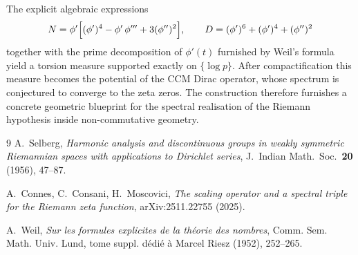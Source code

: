 \documentclass[11pt,a4paper]{article}
\begin{document}
The explicit algebraic expressions
\[
N=\phi'\Bigl[(\phi')^4-\phi'\,\phi'''+3(\phi'')^2\Bigr],\qquad
D=(\phi')^6+(\phi')^4+(\phi'')^2
\]
together with the prime decomposition of \(\phi'(t)\) furnished by Weil's formula yield a torsion measure supported exactly on \(\{\log p\}\). After compactification this measure becomes the potential of the CCM Dirac operator, whose spectrum is conjectured to converge to the zeta zeros. The construction therefore furnishes a concrete geometric blueprint for the spectral realisation of the Riemann hypothesis inside non-commutative geometry.

\begin{thebibliography}{9}
A.~Selberg,
\emph{Harmonic analysis and discontinuous groups in weakly symmetric Riemannian spaces with applications to Dirichlet series},
J.~Indian Math.~Soc.~\textbf{20} (1956), 47--87.

A.~Connes, C.~Consani, H.~Moscovici,
\emph{The scaling operator and a spectral triple for the Riemann zeta function},
arXiv:2511.22755 (2025).

A.~Weil,
\emph{Sur les formules explicites de la th\'eorie des nombres},
Comm. Sem. Math. Univ. Lund, tome suppl. d\'edi\'e \`a Marcel Riesz (1952), 252--265.
\end{thebibliography}
\end{document}
